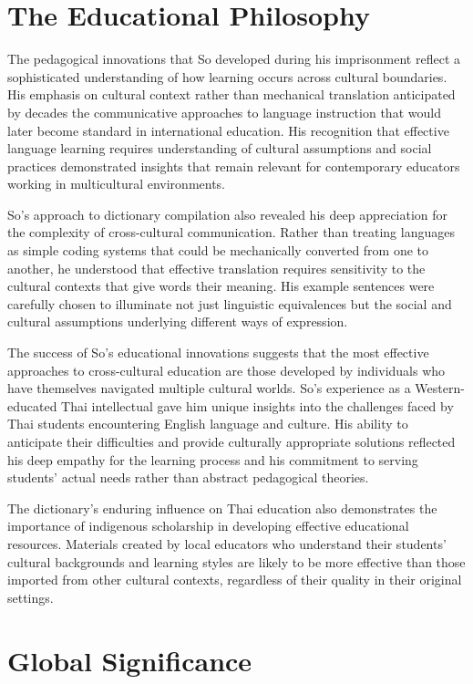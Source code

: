 \documentclass[
  Letterpaper,
]{scrbook}
\begin{document}
\section{The Educational Philosophy}\label{the-educational-philosophy}

The pedagogical innovations that So developed during his imprisonment
reflect a sophisticated understanding of how learning occurs across
cultural boundaries. His emphasis on cultural context rather than
mechanical translation anticipated by decades the communicative
approaches to language instruction that would later become standard in
international education. His recognition that effective language
learning requires understanding of cultural assumptions and social
practices demonstrated insights that remain relevant for contemporary
educators working in multicultural environments.

So's approach to dictionary compilation also revealed his deep
appreciation for the complexity of cross-cultural communication. Rather
than treating languages as simple coding systems that could be
mechanically converted from one to another, he understood that effective
translation requires sensitivity to the cultural contexts that give
words their meaning. His example sentences were carefully chosen to
illuminate not just linguistic equivalences but the social and cultural
assumptions underlying different ways of expression.

The success of So's educational innovations suggests that the most
effective approaches to cross-cultural education are those developed by
individuals who have themselves navigated multiple cultural worlds. So's
experience as a Western-educated Thai intellectual gave him unique
insights into the challenges faced by Thai students encountering English
language and culture. His ability to anticipate their difficulties and
provide culturally appropriate solutions reflected his deep empathy for
the learning process and his commitment to serving students' actual
needs rather than abstract pedagogical theories.

The dictionary's enduring influence on Thai education also demonstrates
the importance of indigenous scholarship in developing effective
educational resources. Materials created by local educators who
understand their students' cultural backgrounds and learning styles are
likely to be more effective than those imported from other cultural
contexts, regardless of their quality in their original settings.

\section{Global Significance}\label{global-significance}
\end{document}
